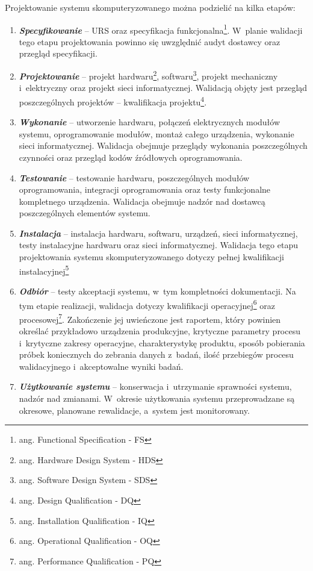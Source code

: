 \documentclass{xmgr}
\begin{document}
\textcolor{sb}{Projektowanie systemu skomputeryzowanego można podzielić na kilka etapów:}

\begin{enumerate}
  \item \textbf{\textit{Specyfikowanie}} – \textcolor{sa}{URS oraz specyfikacja funkcjonalna\footnote{ang. Functional Specification - FS}. W~planie walidacji tego etapu projektowania powinno się uwzględnić audyt dostawcy oraz przegląd specyfikacji.}
  \item \textbf{\textit{Projektowanie}} – \textcolor{sa}{projekt hardwaru\footnote{ang. Hardware Design System - HDS}, softwaru\footnote{ang. Software Design System - SDS}, projekt mechaniczny i~elektryczny oraz projekt sieci informatycznej. Walidacją objęty jest przegląd poszczególnych projektów – kwalifikacja projektu\footnote{ang. Design Qualification - DQ}.}
  \item \textbf{\textit{Wykonanie}} – \textcolor{sa}{utworzenie hardwaru, połączeń elektrycznych modułów systemu, oprogramowanie modułów, montaż całego urządzenia, wykonanie sieci informatycznej. Walidacja obejmuje przeglądy wykonania poszczególnych czynności oraz przegląd kodów źródłowych oprogramowania.}
\item \textbf{\textit{Testowanie}} – \textcolor{sa}{testowanie hardwaru, poszczególnych modułów oprogramowania,  integracji oprogramowania oraz testy funkcjonalne kompletnego urządzenia. Walidacja obejmuje nadzór nad dostawcą poszczególnych elementów systemu.}
\item \textbf{\textit{Instalacja}} – \textcolor{sa}{instalacja hardwaru, softwaru, urządzeń, sieci informatycznej, testy instalacyjne hardwaru oraz sieci informatycznej. Walidacja tego etapu projektowania systemu skomputeryzowanego dotyczy pełnej kwalifikacji instalacyjnej\footnote{ang. Installation Qualification - IQ}}
\item \textbf{\textit{Odbiór}} – \textcolor{sa}{testy akceptacji systemu, w~tym kompletności dokumentacji. Na tym etapie realizacji, walidacja dotyczy kwalifikacji operacyjnej\footnote{ang. Operational Qualification - OQ} oraz procesowej\footnote{ang. Performance Qualification - PQ}. Zakończenie jej uwieńczone jest raportem, który powinien określać przykładowo urządzenia produkcyjne, krytyczne parametry procesu i~krytyczne zakresy operacyjne, charakterystykę produktu, sposób pobierania próbek koniecznych do zebrania danych z~badań, ilość przebiegów procesu walidacyjnego i~akceptowalne wyniki badań.}
\item \textbf{\textit{Użytkowanie systemu}} – \textcolor{sa}{konserwacja i~utrzymanie sprawności systemu, nadzór nad zmianami. W~okresie użytkowania systemu przeprowadzane są okresowe, planowane rewalidacje, a~system jest monitorowany.\cite{LAB-EL2}}
\end{enumerate}
\end{document}

